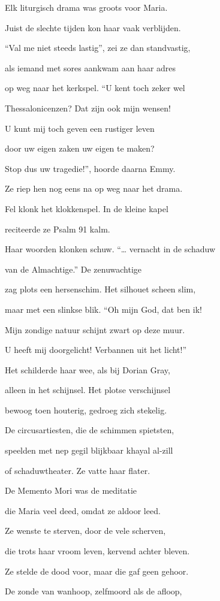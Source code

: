 Elk liturgisch drama
was groots voor Maria.

Juist de slechte tijden
kon haar vaak verblijden.

“Val me niet steeds lastig”,
zei ze dan standvastig,

als iemand met sores
aankwam aan haar adres

op weg naar het kerkspel.
“U kent toch zeker wel

Thessalonicenzen?
Dat zijn ook mijn wensen!

U kunt mij toch geven
een rustiger leven

door uw eigen zaken
uw eigen te maken?

Stop dus uw tragedie!”,
hoorde daarna Emmy.

Ze riep hen nog eens na
op weg naar het drama.

Fel klonk het klokkenspel.
In de kleine kapel

reciteerde ze Psalm
91 kalm.

Haar woorden klonken schuw.
“… vernacht in de schaduw

van de Almachtige.”
De zenuwachtige

zag plots een hersenschim.
Het silhouet scheen slim,

maar met een slinkse blik.
“Oh mijn God, dat ben ik!

Mijn zondige natuur
schijnt zwart op deze muur.

U heeft mij doorgelicht!
Verbannen uit het licht!”

Het schilderde haar wee,
als bij Dorian Gray,

alleen in het schijnsel.
Het plotse verschijnsel

bewoog toen houterig,
gedroeg zich stekelig.

De circusartiesten,
die de schimmen spietsten,

speelden met nep gegil
blijkbaar khayal al-zill

of schaduwtheater.
Ze vatte haar flater.

De Memento Mori
was de meditatie

die Maria veel deed,
omdat ze aldoor leed.

Ze wenste te sterven,
door de vele scherven,

die trots haar vroom leven,
kervend achter bleven.

Ze stelde de dood voor,
maar die gaf geen gehoor.

De zonde van wanhoop,
zelfmoord als de afloop,

